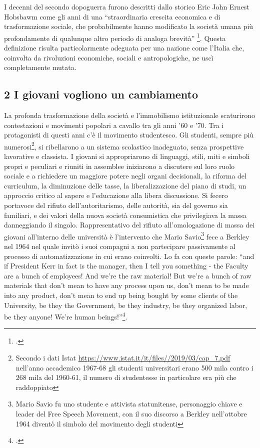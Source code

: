I decenni del secondo dopoguerra furono descritti dallo storico Eric John Ernest Hobsbawm come gli anni di una \enquote{straordinaria crescita economica e di trasformazione sociale, che probabilmente hanno modificato la società umana più profondamente di qualunque altro periodo di analoga brevità} \footcite{Hobsbawm}.
Questa definizione risulta particolarmente adeguata per una nazione come l'Italia che, coinvolta da rivoluzioni economiche, sociali e antropologiche, ne uscì completamente mutata.



\subsection{2 I giovani vogliono un cambiamento}
La profonda trasformazione della società e l'immobilismo istituzionale scaturirono contestazioni e movimenti popolari a cavallo tra gli anni '60 e '70.
Tra i protagonisti di questi anni c'è il movimento studentesco.
Gli studenti, sempre più numerosi\footnote{Secondo i dati Istat \url{https://www.istat.it/it/files//2019/03/cap_7.pdf} 
nell'anno accademico 1967-68 gli studenti universitari erano 500 mila contro i 268 mila del 1960-61, il numero di studentesse in particolare era più che raddoppiato}, si ribellarono a un sistema scolastico inadeguato, senza prospettive lavorative e classista.
I giovani si appropriarono di linguaggi, stili, miti e simboli propri e peculiari e riuniti in assemblee iniziarono a discutere sul loro ruolo sociale e a richiedere un maggiore potere negli organi decisionali, la riforma del curriculum, la diminuzione delle tasse, la liberalizzazione del piano di studi, un approccio critico al sapere e l’educazione alla libera discussione.
Si fecero portavoce del rifiuto dell'autoritarismo, delle autorità, sia del governo sia familiari, e dei valori della nuova società consumistica che privilegiava la massa danneggiando il singolo.
Rappresentativo del rifiuto all'omologazione di massa dei giovani all'interno delle università è l'intervento che Mario Savio\footnote{Mario Savio fu uno studente e attivista statunitense, personaggio chiave e leader del Free Speech Movement, con il suo discorso a Berkley nell'ottobre 1964 diventò il simbolo del movimento degli studenti} fece a Berkley nel 1964 nel quale invitò i suoi compagni a non partecipare passivamente al processo di automatizzazione in cui erano coinvolti.
Lo fa con queste parole: \enquote{and if President Kerr in fact is the manager, then I tell you something - the Faculty are a bunch of employees! And we're the raw material! But we're a bunch of raw materials that don't mean to have any process upon us, don't mean to be made into any product, don't mean to end up being bought by some clients of the University, be they the Government, be they industry, be they organized labor, be they anyone! We're human beings!}\footcite{Savio}.
